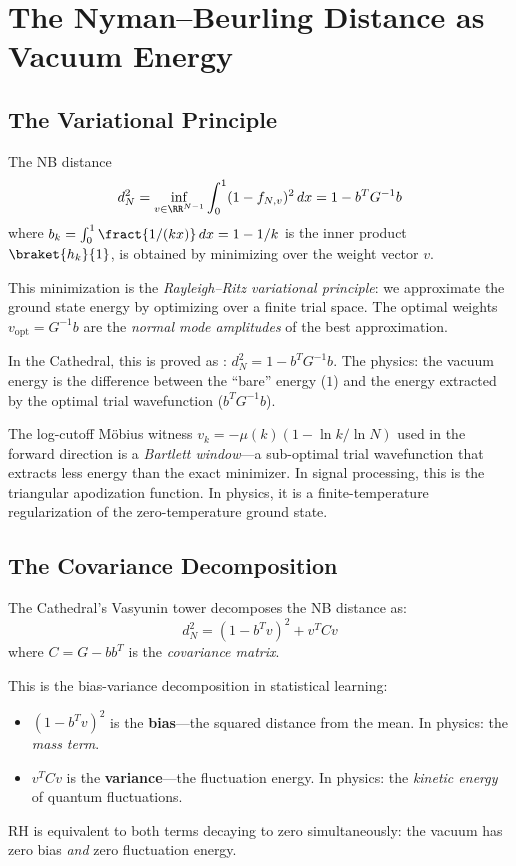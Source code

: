 \section{The Nyman--Beurling Distance as Vacuum Energy}
\label{sec:vacuum}

\subsection{The Variational Principle}

The NB distance
\[
  d_N^2 = \inf_{v \in \RR^{N-1}} \int_0^1 (1 - f_{N,v})^2\,dx
  = 1 - b^T G^{-1} b
\]
where $b_k = \int_0^1 \fract{1/(kx)}\,dx = 1 - 1/k$ is the inner product
$\braket{h_k}{1}$, is obtained by minimizing over the weight vector $v$.

\begin{principle}
This minimization is the \emph{Rayleigh--Ritz variational principle}:
we approximate the ground state energy by optimizing over a finite
trial space. The optimal weights $v_{\mathrm{opt}} = G^{-1}b$ are the
\emph{normal mode amplitudes} of the best approximation.

In the Cathedral, this is proved as :
$d_N^2 = 1 - b^T G^{-1} b$. The physics: the vacuum energy is the
difference between the ``bare'' energy ($1$) and the energy extracted
by the optimal trial wavefunction ($b^T G^{-1} b$).
\end{principle}

The log-cutoff M\"obius witness $v_k = -\mu(k)(1 - \ln k / \ln N)$ used
in the forward direction is a \emph{Bartlett window}---a sub-optimal
trial wavefunction that extracts less energy than the exact minimizer.
In signal processing, this is the triangular apodization function.
In physics, it is a finite-temperature regularization of the
zero-temperature ground state.

\subsection{The Covariance Decomposition}

The Cathedral's Vasyunin tower decomposes the NB distance as:
\[
  d_N^2 = (1 - b^T v)^2 + v^T C v
\]
where $C = G - b b^T$ is the \emph{covariance matrix}.

\begin{correspondence}
This is the bias-variance decomposition in statistical learning:
\begin{itemize}
  \item $(1 - b^T v)^2$ is the \textbf{bias}---the squared distance
    from the mean. In physics: the \emph{mass term}.
  \item $v^T C v$ is the \textbf{variance}---the fluctuation energy.
    In physics: the \emph{kinetic energy} of quantum fluctuations.
\end{itemize}
RH is equivalent to both terms decaying to zero simultaneously:
the vacuum has zero bias \emph{and} zero fluctuation energy.
\end{correspondence}

